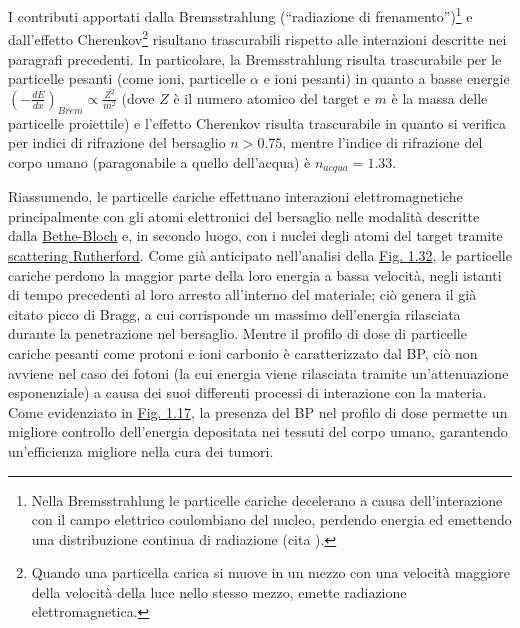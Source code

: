 \documentclass[12pt,a4paper,twoside]{report}
\begin{document}
	I contributi apportati dalla Bremsstrahlung (``radiazione di frenamento'')\footnote{Nella Bremsstrahlung le particelle cariche decelerano a causa dell'interazione con il campo elettrico coulombiano del nucleo, perdendo energia ed emettendo una distribuzione continua di radiazione (cita
		).} e dall'effetto Cherenkov\footnote{Quando una particella carica si muove in un mezzo con una velocità maggiore della velocità della luce nello stesso mezzo, emette radiazione elettromagnetica.} risultano trascurabili rispetto alle interazioni descritte nei paragrafi precedenti. In particolare, la Bremsstrahlung risulta trascurabile per le particelle pesanti (come ioni, particelle $\alpha$ e ioni pesanti) in quanto a basse energie $\left(-\frac{dE}{dx}\right)_{Brem}\propto\frac{Z^2}{m^2}$ (dove $Z$ è il numero atomico del target e $m$ è la massa delle particelle proiettile) e l'effetto Cherenkov risulta trascurabile in quanto si verifica per indici di rifrazione del bersaglio $n>0.75$, mentre l'indice di rifrazione del corpo umano (paragonabile a quello dell'acqua) è $n_{acqua}=1.33$.
	
	Riassumendo, le particelle cariche effettuano interazioni elettromagnetiche principalmente con gli atomi elettronici del bersaglio nelle modalità descritte dalla \hyperref[par:bethe_bloch]{Bethe-Bloch} e, in secondo luogo, con i nuclei degli atomi del target tramite \hyperref[par:scattering_Rutherford]{scattering Rutherford}. Come già anticipato nell'analisi della \hyperref[fig:bethe_bloch]{Fig. 1.32}, le particelle cariche perdono la maggior parte della loro energia a bassa velocità, negli istanti di tempo precedenti al loro arresto all'interno del materiale; ciò genera il già citato picco di Bragg, a cui corrisponde un massimo dell'energia rilasciata durante la penetrazione nel bersaglio. Mentre il profilo di dose di particelle cariche pesanti come protoni e ioni carbonio è caratterizzato dal BP, ciò non avviene nel caso dei fotoni (la cui energia viene rilasciata tramite un'attenuazione esponenziale) a causa dei suoi differenti processi di interazione con la materia. Come evidenziato in \hyperref[fig:photon]{Fig. 1.17}, la presenza del BP nel profilo di dose permette un migliore controllo dell'energia depositata nei tessuti del corpo umano, garantendo un'efficienza migliore nella cura dei tumori.
	
\end{document}
